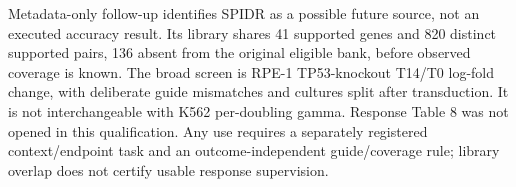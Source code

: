 Metadata-only follow-up identifies SPIDR \citep{fielden2025} as a possible future source, not an executed accuracy result. Its library shares 41 supported genes and 820 distinct supported pairs, 136 absent from the original eligible bank, before observed coverage is known. The broad screen is RPE-1 TP53-knockout T14/T0 log-fold change, with deliberate guide mismatches and cultures split after transduction. It is not interchangeable with K562 per-doubling gamma. Response Table 8 was not opened in this qualification. Any use requires a separately registered context/endpoint task and an outcome-independent guide/coverage rule; library overlap does not certify usable response supervision.
